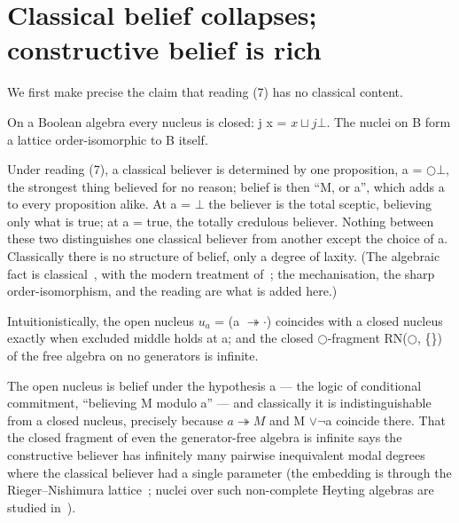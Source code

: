 \section{Classical belief collapses; constructive belief is rich}\label{3-classical-belief-collapses-constructive-belief-is-rich}

We first make precise the claim that reading (7) has no classical
content.

\begin{theorem}\label{thm:collapse}
On a
Boolean algebra every nucleus is closed: j x = \ensuremath{x \sqcup j \bot}. The nuclei on B
form a lattice order-isomorphic to B itself.
\end{theorem}

Under reading (7), a classical believer is determined by one proposition,
a = \ensuremath{\bigcirc\bot}, the strongest thing believed for no reason; belief is then
``M, or a'', which adds a to every proposition alike. At
a = \ensuremath{\bot} the believer is the total sceptic, believing only what is
true; at a = true, the totally credulous believer. Nothing between these two
distinguishes one classical believer from another except the choice of
a. Classically there is no structure of belief, only a
degree of laxity. (The algebraic fact is
classical~\cite{BeazerMacnab1979,Macnab1981}, with the modern treatment
of~\cite{AvilaBezhanishviliMorandiZaldivar2020}; the mechanisation, the
sharp order-isomorphism, and the reading are what is added here.)

\begin{theorem}\label{thm:openclosed}
Intuitionistically, the open nucleus \ensuremath{u_{a}} = (a \ensuremath{\twoheadrightarrow \cdot}) coincides with a
closed nucleus exactly when excluded middle holds at a; and the closed
\ensuremath{\bigcirc}-fragment RN(\ensuremath{\bigcirc}, \{\}) of the free algebra on no generators is infinite.
\end{theorem}

The open nucleus is belief under the hypothesis a --- the logic
of conditional commitment, ``believing M modulo a'' --- and classically it is
indistinguishable from a closed nucleus, precisely because \ensuremath{a \twoheadrightarrow M} and M \ensuremath{\vee \lnot}a coincide there. That the
closed fragment of even the generator-free algebra is infinite says the
constructive believer has infinitely many pairwise inequivalent modal
degrees where the classical believer had a single parameter (the
embedding is through the Rieger--Nishimura
lattice~\cite{Rieger1949,Nishimura1960}; nuclei over such
non-complete Heyting algebras are studied
in~\cite{Erne2022,ErnePicadoPultr2022}).

